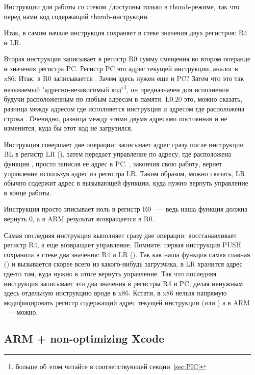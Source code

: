 Инструкции для работы со стеком \PUSH/\POP доступны только в thumb-режиме, так что перед нами код содержащий thumb-инструкции.

Итак, в самом начале инструкция  сохраняет в стеке значения двух регистров: R4 и LR.

Вторая инструкция  записывает в регистр R0 сумму смещения во втором операнде 
и значения регистра PC.
Регистр PC это адрес текущей инструкции, аналог \EIP в x86.
Итак, в R0 записывается . Зачем здесь нужен еще и PC? Затем что это так называемый "адресно-независимый код"\footnote{больше об этом читайте в соответствующей секции~\ref{sec:PIC}}, он предназначен для исполнения будучи расположенным по любым адресам в памяти.
L0.20 это, можно сказать, разница между адресом где исполняется инструкция  и адресом где расположена строка . Очевидно, разница между этими двумя адресами постоянная и не изменится, куда бы этот код не загрузился.

Инструкция  совершает две операции: записывает адрес сразу после инструкции BL в регистр LR (), затем передает управление по адресу, где расположена функция , 
просто записав её адрес в PC.
, закончив свою работу, вернет управление используя адрес из регистра LR. Таким образом, можно сказать,
LR обычно содержит адрес в вызывающей функции, куда нужно вернуть управление в конце работы.

Инструкция  просто зписывает ноль в регистр R0 ~--- ведь наша функция должна вернуть 0, а в ARM результат возвращается в R0.

Самая последняя инструкция  выполняет сразу две операции: восстанавливает регистр R4, а еще возвращает управление. Помните: первая инструкция PUSH сохранила в стеке два значения: R4 и LR ().
Так как наша функция самая главная () и вызывается скорее всего из какого-нибудь загрузчика, 
в LR хранится адрес где-то там, куда нужно в итоге вернуть управление.
Так что последняя инструкция \POP записывает эти два значения в регистры R4 и PC, делая ненужным здесь отдельную 
инструкцию вроде \RET в x86. Кстати, в x86 нельзя напрямую модифицировать регистр содержащий адрес текущей инструкции (\EIP или \RIP) а в ARM ~--- можно.

\subsection{ARM + non-optimizing Xcode}

